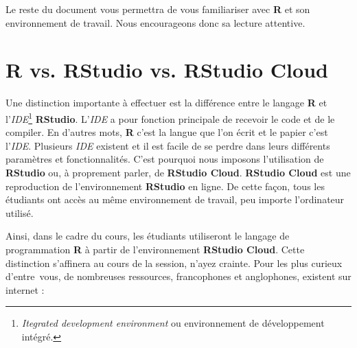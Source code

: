 \documentclass[10.5pt,a4paper]{article}
\begin{document}
Le reste du document vous permettra de vous familiariser avec \textbf{R} et son environnement de travail. Nous encourageons donc sa lecture attentive.

\section{R vs. RStudio vs. RStudio Cloud}\label{R vs RStudio vs RStudio Cloud}

Une distinction importante à effectuer est la différence entre le langage \textbf{R} et l'\textit{IDE}\footnote{\emph{Itegrated development environment} ou environnement de développement intégré.} \textbf{RStudio}. L'\textit{IDE} a pour fonction principale de recevoir le code et de le compiler. En d'autres mots, \textbf{R} c'est la langue que l'on écrit et le papier c'est l'\textit{IDE}. Plusieurs \textit{IDE} existent et il est facile de se perdre dans leurs différents paramètres et fonctionnalités. C'est pourquoi nous imposons l'utilisation de \textbf{RStudio} ou, à proprement parler, de \textbf{RStudio Cloud}. \textbf{RStudio Cloud} est une reproduction de l'environnement \textbf{RStudio} en ligne. De cette façon, tous les étudiants ont accès au même environnement de travail, peu importe l'ordinateur utilisé.  

Ainsi, dans le cadre du cours, les étudiants utiliseront le langage de programmation \textbf{R} à partir de l'environnement \textbf{RStudio Cloud}. Cette distinction s'affinera au cours de la session, n'ayez crainte. Pour les plus curieux d'entre\ vous, de nombreuses ressources, francophones et anglophones, existent sur internet :
\end{document}
